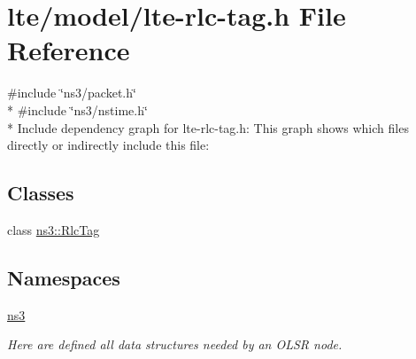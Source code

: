 \hypertarget{lte-rlc-tag_8h}{}\section{lte/model/lte-\/rlc-\/tag.h File Reference}
\label{lte-rlc-tag_8h}
{\ttfamily \#include \char`\"{}ns3/packet.\+h\char`\"{}}\\*
{\ttfamily \#include \char`\"{}ns3/nstime.\+h\char`\"{}}\\*
Include dependency graph for lte-\/rlc-\/tag.h\+:
This graph shows which files directly or indirectly include this file\+:
\subsection*{Classes}
\begin{DoxyCompactItemize}
\item 
class \hyperlink{classns3_1_1RlcTag}{ns3\+::\+Rlc\+Tag}
\end{DoxyCompactItemize}
\subsection*{Namespaces}
\begin{DoxyCompactItemize}
\item 
 \hyperlink{namespacens3}{ns3}
\begin{DoxyCompactList}\small\item\em Here are defined all data structures needed by an O\+L\+SR node. \end{DoxyCompactList}\end{DoxyCompactItemize}
